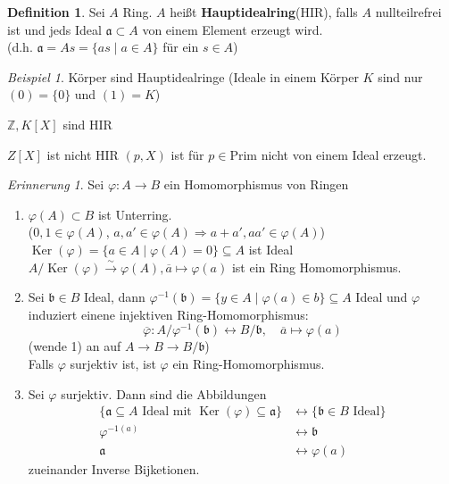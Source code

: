 \documentclass[10pt,a4paper]{article}
\newcommand{\Z}{\ensuremath{\mathbb{Z}}}
\newcommand{\ol}[1]{\overline{#1}}
\newcommand{\isomfunc}{\ensuremath{\xrightarrow{\sim}}}
\newcommand{\Ker}{\ensuremath{\operatorname{Ker}}}
\newcounter{thm}[section]
\theoremstyle{definition}
\newtheorem{definition}[thm]{Definition}
\theoremstyle{plain}
\theoremstyle{remark}
\newtheorem{rem}[thm]{Erinnerung}
\newtheorem{exm}[thm]{Beispiel}
\begin{document}
\begin{definition}
	Sei $A$ Ring. $A$ heißt \textbf{Hauptidealring}(HIR), falls $A$ nullteilrefrei ist und jeds Ideal $\mathfrak a\subset A$ von einem Element erzeugt wird.\\
	(d.h. $\mathfrak a=As=\{as\mid a\in A\}$ für ein $s\in A$)
\end{definition}
\begin{exm}
	\item Körper sind Hauptidealringe (Ideale in einem Körper $K$ sind nur $(0)=\{0\}$ und $(1)=K$)
	\item  $\Z,K[X]$ sind HIR
	\item $Z[X]$ ist nicht HIR $(p,X)$ ist für $p\in\text{Prim}$ nicht von einem Ideal erzeugt.
\end{exm}
\begin{rem}
	Sei $\varphi:A\rightarrow B$ ein Homomorphismus von Ringen
	\begin{enumerate}
		\item $\varphi(A)\subset B$ ist Unterring.\\
		($0,1\in\varphi(A)$, $a,a'\in\varphi(A)\Rightarrow a+a',aa'\in \varphi(A)$)\\
		$\Ker(\varphi)=\{a\in A\mid\varphi(A)=0\}\subseteq A$ ist Ideal\\
		$A/\Ker(\varphi)\isomfunc\varphi(A),\ol{a}\mapsto \varphi(a)$ ist ein Ring Homomorphismus.
		\item Sei $\mathfrak b\in B$ Ideal, dann $\varphi^{-1}(\mathfrak b)=\{y\in A\mid\varphi(a)\in b\}\subseteq A$ Ideal und $\varphi$ induziert einene injektiven Ring-Homomorphismus:
		\[\ol{\varphi}:A/\varphi^{-1}(\mathfrak b)\leftrightarrow B/\mathfrak b, \quad \ol{a}\mapsto\varphi(a)\]
		(wende 1) an auf $A\rightarrow B\rightarrow B/\mathfrak b$)\\
		Falls $\varphi$ surjektiv ist, ist $\varphi$ ein Ring-Homomorphismus.
		\item Sei $\varphi$ surjektiv. Dann sind die Abbildungen
		\begin{align*}
		\{\text{$\mathfrak a\subseteq A$ Ideal mit $\Ker(\varphi)\subseteq\mathfrak a$}\}&\leftrightarrow \{\text{$\mathfrak b\in B$ Ideal}\}\\
		\varphi^{-1(a)}&\leftrightarrow \mathfrak b\\
		\mathfrak a&\leftrightarrow \varphi(a)
		\end{align*}
		zueinander Inverse Bijketionen.
	\end{enumerate}
\end{rem}
\end{document}
